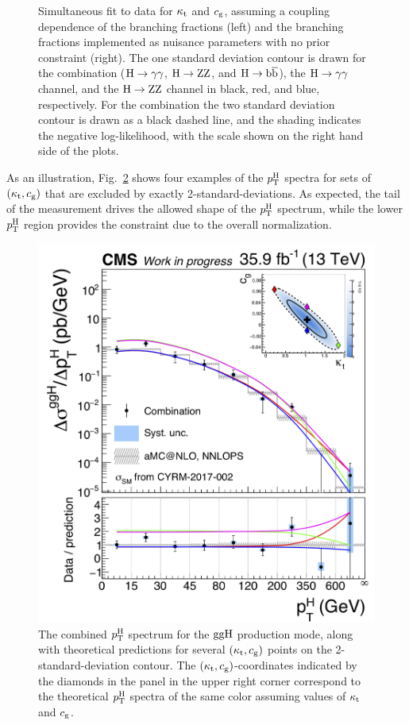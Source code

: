 \begin{figure}[hbtp]
\begin{center}
{        }
    \caption{
        Simultaneous fit to data for $\kappa_{\mathrm{t}}$ and $c_\mathrm{g}$, assuming a coupling dependence of the branching fractions (left) and the branching fractions implemented as nuisance parameters with no prior constraint (right).
        The one standard deviation contour is drawn for the combination ($\mathrm{H}\to\mathrm{\gamma}\mathrm{\gamma}$, $\mathrm{H}\to\mathrm{Z}\mathrm{Z}$, and $\mathrm{H}\to\mathrm{b}\overline{\mathrm{b}}$), the $\mathrm{H}\to\mathrm{\gamma}\mathrm{\gamma}$ channel, and the $\mathrm{H}\to\mathrm{Z}\mathrm{Z}$ channel in black, red, and blue, respectively.
        For the combination the two standard deviation contour is drawn as a black dashed line, and the shading indicates the negative log-likelihood, with the scale shown on the right hand side of the plots.
        }
    \label{fig:ktcg}
  \end{center}
\end{figure}


As an illustration, Fig.~\ref{fig:ktcg-points} shows four examples of the $p_\mathrm{T}^\mathrm{H}$ spectra for sets of $(\kappa_{\mathrm{t}}, c_\mathrm{g})$ that are excluded by exactly 2-standard-deviations.
% 
As expected, the tail of the measurement drives the allowed shape of the $p_\mathrm{T}^\mathrm{H}$ spectrum, while the lower $p_\mathrm{T}^\mathrm{H}$ region provides the constraint due to the overall normalization.


\begin{figure}[hbtp]
  \begin{center}
    \includegraphics[width=0.55\linewidth]{img/interpretation/spectra_pth_ggH_withmulticont.png}
    \caption{
        The combined $p_\mathrm{T}^\mathrm{H}$ spectrum for the $\mathrm{g}\mathrm{g}\mathrm{H}$ production mode, along with theoretical predictions for several $(\kappa_{\mathrm{t}}, c_\mathrm{g})$ points on the 2-standard-deviation contour.
        The $(\kappa_{\mathrm{t}},c_\mathrm{g})$-coordinates indicated by the diamonds in the panel in the upper right corner correspond to the theoretical $p_\mathrm{T}^\mathrm{H}$ spectra of the same color assuming values of $\kappa_{\mathrm{t}}$ and $c_\mathrm{g}$.
        }
    \label{fig:ktcg-points}
  \end{center}
\end{figure}


